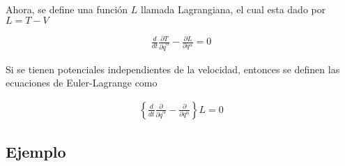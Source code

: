 Ahora, se define una función $L$ llamada Lagrangiana, el cual esta dado por $L = T - V$

\begin{gather*}
    \frac{d}{dt}  \frac{\partial T}{\partial \dot{q}^{\alpha}} -\frac{\partial L}{\partial q^{\alpha}} = 0
\end{gather*}

Si se tienen potenciales independientes de la velocidad, entonces se definen las ecuaciones de Euler-Lagrange como 

\begin{gather*}
    \left\{\frac{d}{dt}  \frac{\partial }{\partial \dot{q}^{\alpha}} -\frac{\partial }{\partial q^{\alpha}}\right\} L  = 0
\end{gather*}

\subsection{Ejemplo}
